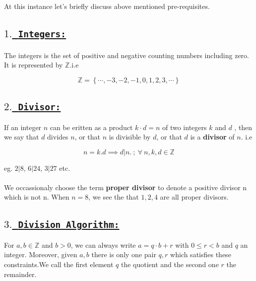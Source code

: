 \documentclass[a4paper,12pt]{article}
\begin{document}
    At this instance let's briefly discuss above mentioned pre-requisites.

    \subsection*{\underline{\textbf{$1.$\ \texttt{Integers:}}}}

    \paragraph*{}

    The integers is the set of positive and negative counting numbers including zero.
    It is represented by $\mathbb{Z}$.i.e
    
    $$\mathbb{Z} = \left\{\cdots, -3, -2, -1, 0, 1, 2, 3, \cdots\right\}$$

    \subsection*{\underline{$2.$\ \texttt{\textbf{Divisor:}}}}

    If an integer $n$ can be eritten as a product $k\cdot d = n$ of two integers $k$ and $d$ , then we say that $d$ divides $n$, or that $n$ is divisible by $d$, or that $d$ is a \textbf{divisor} of $n$. i.e
    
    $$n = k.d \implies d|n. \ ;\ \forall\ n,k,d \in \mathbb{Z} $$
    
    eg. $2|8$, $6|24$, $3|27$ etc.

    \paragraph*{}
    
    We occassionaly choose the term {\bf proper divisor} to denote a positive divisor n which is not n. When $n = 8$, we see the that $1, 2, 4$ are all proper divisors.

    \pagebreak

    \subsection*{\underline{$3.$\ \texttt{\textbf{Division Algorithm:}}}}

    For $a,b \in \mathbb{Z}$ and $b > 0$, we can always write $a = q\cdot b + r$ with $0\leq r < b$ and $q$ an integer. Moreover, given $a,b$ there is only one pair $q,r$ which satisfies these constraints.We call the first element $q$ the quotient and the second one $r$ the remainder.
    
\end{document}
